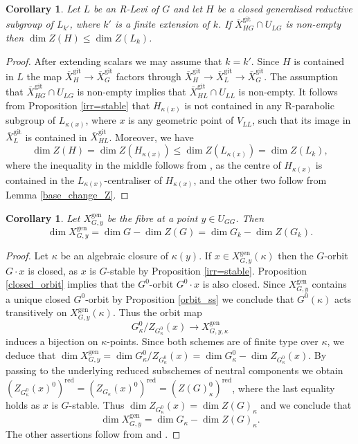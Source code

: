 \documentclass{amsart}
\newtheorem{cor}[prop]{Corollary}
\theoremstyle{definition}
\theoremstyle{remark}
\newcommand{\gen}{\mathrm{gen}}
\newcommand{\gps}{\mathrm{git}}
\newcommand{\red}{\mathrm{red}}
\newcommand{\Xbar}{\overline{X}}
\begin{document}
\begin{cor}\label{dim_Z_same} Let $L$ be an R-Levi of $G$ and let $H$ be a closed generalised reductive subgroup of $L_{k'}$, where 
$k'$ is a finite extension of $k$. If $\Xbar^{\gps}_{HG}\cap U_{LG}$ is non-empty then  $\dim Z(H)\le \dim Z(L_k)$. 
\end{cor}
\begin{proof} After extending scalars we may assume that $k=k'$. Since $H$ is contained
in $L$ the map $\Xbar^{\gps}_H \rightarrow \Xbar^{\gps}_G$ factors through 
$\Xbar^{\gps}_H \rightarrow \Xbar^{\gps}_L\rightarrow \Xbar^{\gps}_G$. The assumption that 
$\Xbar^{\gps}_{HG}\cap U_{LG}$ is non-empty implies that $\Xbar^{\gps}_{HL} \cap U_{LL}$ is non-empty. 
It follows from Proposition \ref{irr=stable} that $H_{\kappa(x)}$ is not contained 
in any R-parabolic subgroup of $L_{\kappa(x)}$, where $x$ is any geometric point of $V_{LL}$, 
such that its image in $\Xbar^{\gps}_L$ is contained in $\Xbar^{\gps}_{HL}$. 
Moreover, we have 
$$\dim Z(H)= \dim Z(H_{\kappa(x)})\le \dim Z(L_{\kappa(x)}) = \dim Z(L_k),$$
where the inequality in the middle follows from \cite[Lemma 6.2]{martin}, as the centre of $H_{\kappa(x)}$ is 
contained in the $L_{\kappa(x)}$-centraliser of $H_{\kappa(x)}$,
and the other two follow from Lemma \ref{base_change_Z}. 
\end{proof} 

\begin{cor}\label{dim_fibre_GG} Let $X^{\gen}_{G, y}$ be the fibre at a 
point $y\in U_{GG}$. Then 
$$\dim X^{\gen}_{G, y}= \dim G -\dim Z(G)=\dim G_k - \dim Z(G_k).$$
\end{cor}

\begin{proof} Let $\kappa$ be an algebraic closure of $\kappa(y)$. If $x\in X^{\gen}_{G, y}(\kappa)$ then 
the $G$-orbit $G\cdot x$ is closed, as $x$ is $G$-stable 
by Proposition \ref{irr=stable}. Proposition \ref{closed_orbit} implies that the
$G^0$-orbit $G^0\cdot x$ is also closed. Since $X^{\gen}_{G, y}$ contains 
a unique closed $G^0$-orbit by Proposition \ref{orbit_ss} we conclude 
that $G^0(\kappa)$ acts transitively on $X^{\gen}_{G, y}(\kappa)$.
Thus the orbit map 
$$G^0_{\kappa}/ Z_{G^0_{\kappa}}(x) \rightarrow X^{\gen}_{G, y, \kappa}$$
induces a bijection on $\kappa$-points. Since both schemes are 
of finite type over $\kappa$, we deduce that 
$\dim X^{\gen}_{G, y}= \dim G^0_{\kappa}/ Z_{G^0_{\kappa}}(x)= \dim G^0_{\kappa} - \dim Z_{G^0_{\kappa}}(x)$.
 By passing to the underlying reduced subschemes of neutral components 
we obtain $(Z_{G^0_{\kappa}}(x)^0)^{\red} = (Z_{G_{\kappa}}(x)^0)^{\red}= (Z(G)_{\kappa}^0)^{\red}$, where the last equality 
holds as $x$ is $G$-stable.  Thus $\dim Z_{G^0_{\kappa}}(x)= \dim Z(G)_{\kappa}$ and we conclude
that 
$$\dim X^{\gen}_{G, y} = \dim G_{\kappa} - \dim Z(G)_{\kappa}.$$
The other assertions follow from  and .
\end{proof}
\end{document}

